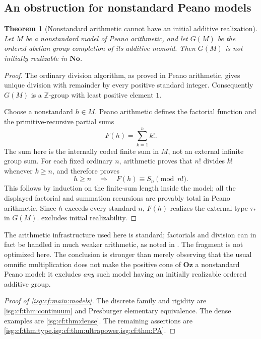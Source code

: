 \documentclass[11pt]{article}
\newtheorem{theorem}{Theorem}[section]
\theoremstyle{definition}
\theoremstyle{remark}
\newcommand{\No}{\ensuremath{\mathbf{No}}}
\newcommand{\Oz}{\ensuremath{\mathbf{Oz}}}
\newcommand{\Z}{\mathbb{Z}}
\begin{document}
\subsection{An obstruction for nonstandard Peano models}\label{isg:cf:sec:PA}
\begin{theorem}[Nonstandard arithmetic cannot have an initial additive realization]
\label{isg:cf:thm:PA}
Let $M$ be a nonstandard model of Peano arithmetic, and let $G(M)$ be
the ordered abelian group completion of its additive monoid. Then
$G(M)$ is not initially realizable in $\No$.
\end{theorem}
\begin{proof}
The ordinary division algorithm, as proved in Peano arithmetic, gives
unique division with remainder by every positive standard integer.
Consequently $G(M)$ is a $\Z$-group with least positive element $1$.

Choose a nonstandard $h\in M$. Peano arithmetic defines the factorial
function and the primitive-recursive partial sums
\[
 F(h)=\sum_{k=1}^{h}k!.
\]
The sum here is the internally coded finite sum in $M$, not an external
infinite group sum. For each fixed ordinary $n$, arithmetic proves
that $n!$ divides $k!$ whenever $k\ge n$, and therefore proves
\[
 h\ge n\quad\Longrightarrow\quad F(h)\equiv S_n\pmod{n!}.
\]
This follows by induction on the finite-sum length inside the model;
all the displayed factorial and summation recursions are provably
total in Peano arithmetic. Since $h$ exceeds every standard $n$,
$F(h)$ realizes the external type $\tau_*$ in $G(M)$.
 excludes initial realizability.
\end{proof}

The arithmetic infrastructure used here is standard; factorials and
division can in fact be handled in much weaker arithmetic, as noted in
\cite{EnayatHamkinsWcislo}. The fragment is not optimized here. The
conclusion is stronger than merely observing that the usual
omnific multiplication does not make the positive cone of $\Oz$ a
nonstandard Peano model: it excludes \emph{any} such model having an
initially realizable ordered additive group.

\begin{proof}[Proof of \cref{isg:cf:main:models}]
The discrete family and rigidity are \cref{isg:cf:thm:continuum} and
Presburger elementary equivalence. The dense examples are
\cref{isg:cf:thm:dense}. The remaining assertions are
\cref{isg:cf:thm:type,isg:cf:thm:ultrapower,isg:cf:thm:PA}.
\end{proof}
\end{document}
